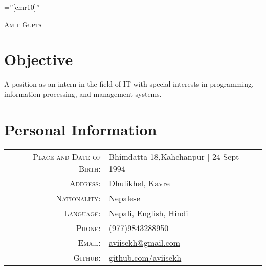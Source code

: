 \documentclass[a4paper,10pt]{article}
\begin{document}

\pagestyle{empty} %

\font\fb=''[cmr10]'' %

\par{\centering
		{\huge \textsc{Amit Gupta}
	}\bigskip\par}

\section{Objective}
A position as an intern in the field of IT with special interests in programming, information processing, and management systems.

\section{Personal Information}

\begin{tabular}{rl}
    \textsc{Place and Date of Birth:} & Bhimdatta-18,Kahchanpur  | 24 Sept 1994 \\
    \textsc{Address:}   & Dhulikhel, Kavre \\
    \textsc{Nationality:} & Nepalese\\
    \textsc{Language:} & Nepali, English, Hindi\\
    \textsc{Phone:}     & (977)9843288950\\
    \textsc{Email:}     & \href{mailto:aviisekh@gmail.com}{aviisekh@gmail.com}\\
    \textsc{Github:} & \href{https://www.github.com/aviisekh}{github.com/aviisekh}\\
\end{tabular}

\end{document}
